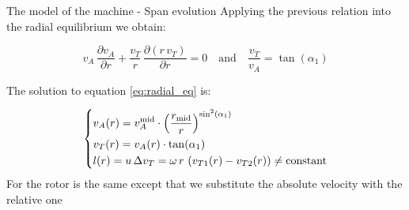 \documentclass{beamer}
\begin{document}
\begin{frame}[t]{The model of the machine - Span evolution}
Applying the previous relation into the radial equilibrium we obtain:

\begin{equation}
\label{eq:radial_eq}
v_{A}\, \frac{\partial v_{A}}{\partial r} + \dfrac{v_{T}}{r} \, \frac{\partial (r \, v_{T})}{\partial r} = 0
\quad \text{and} \quad \frac{v_T}{v_A} = \tan(\alpha_1)
\end{equation}

The solution to equation \ref{eq:radial_eq} is:


\[
   \begin{dcases}
     v_{A}(r) = v_{A}^{\text{mid}} \cdot \left( \frac{r_{\text{mid}}}{r} \right) ^ {\sin^2(\alpha_1)}\\
     v_{T}(r) = v_A(r) \cdot \tan(\alpha_1)\\
     l(r) = u \, \Delta v_T = \omega \, r \, \left( v_{T1} (r) - v_{T2} (r) \right) \neq \text{constant}
   \end{dcases}
\]
For the rotor is the same except that we substitute the absolute velocity with the relative one

\end{frame}
\end{document}
